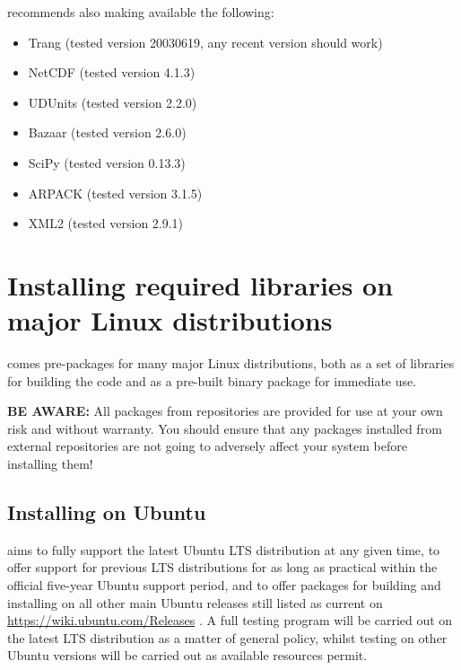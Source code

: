 \fluidity recommends also making available the following:

\begin{itemize}
\item Trang (tested version 20030619, any recent version should work)
\item NetCDF (tested version 4.1.3)
\item UDUnits (tested version 2.2.0)
\item Bazaar (tested version 2.6.0)
\item SciPy (tested version 0.13.3)
\item ARPACK (tested version 3.1.5)
\item XML2 (tested version 2.9.1)
\end{itemize}

\section{Installing required libraries on major Linux distributions}
\label{sec:required_ḻibraries_linux}

\fluidity comes pre-packages for many major Linux distributions, both as a set
of libraries for building the code and as a pre-built \fluidity binary package
for immediate use.

\textbf{BE AWARE:} All packages from \fluidity repositories are provided for
use at your own risk and without warranty. You should ensure that any packages
installed from external repositories are not going to adversely affect your
system before installing them!

\subsection{Installing on Ubuntu}
\label{sec:required_ḻibraries_Ubuntu}

\fluidity aims to fully support the latest Ubuntu LTS distribution at any given
time, to offer support for previous LTS distributions for as long as practical
within the official five-year Ubuntu support period, and to offer packages for
building and installing \fluidity on all other main Ubuntu releases still
listed as current on
\href{https://wiki.ubuntu.com/Releases}{https://wiki.ubuntu.com/Releases}
. A full testing program will be carried out on the latest LTS
distribution as a matter of \fluidity general policy, whilst testing on other
Ubuntu versions will be carried out as available resources permit.

